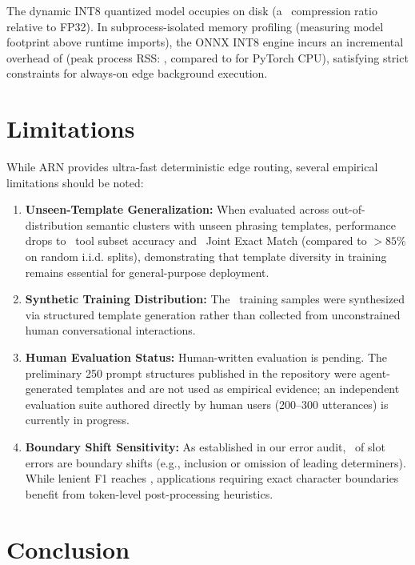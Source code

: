 \documentclass[letterpaper]{article}
\begin{document}
The dynamic INT8 quantized model occupies \textbf{\ModelSizeONNXINT} on disk (a \INTCompressionRatio\ compression ratio relative to FP32). In subprocess-isolated memory profiling (measuring model footprint above runtime imports), the ONNX INT8 engine incurs an incremental overhead of \textbf{\IsolatedIncrRSS} (peak process RSS: \textbf{\IsolatedPeakRSS}, compared to \textbf{\PyTorchPeakRSS} for PyTorch CPU), satisfying strict constraints for always-on edge background execution.

\section{Limitations}

While ARN provides ultra-fast deterministic edge routing, several empirical limitations should be noted:
\begin{enumerate}
    \item \textbf{Unseen-Template Generalization:} When evaluated across out-of-distribution semantic clusters with unseen phrasing templates, performance drops to \PrimaryToolAcc\ tool subset accuracy and \PrimaryJointEM\ Joint Exact Match (compared to $>85\%$ on random i.i.d. splits), demonstrating that template diversity in training remains essential for general-purpose deployment.
    \item \textbf{Synthetic Training Distribution:} The \TotalDatasetSamples\ training samples were synthesized via structured template generation rather than collected from unconstrained human conversational interactions.
    \item \textbf{Human Evaluation Status:} Human-written evaluation is pending. The preliminary 250 prompt structures published in the repository were agent-generated templates and are not used as empirical evidence; an independent evaluation suite authored directly by human users (200--300 utterances) is currently in progress.
    \item \textbf{Boundary Shift Sensitivity:} As established in our error audit, \ErrorBoundaryShiftPct\ of slot errors are boundary shifts (e.g., inclusion or omission of leading determiners). While lenient F1 reaches \PrimaryLenientFOne, applications requiring exact character boundaries benefit from token-level post-processing heuristics.
\end{enumerate}

\section{Conclusion}
\end{document}
